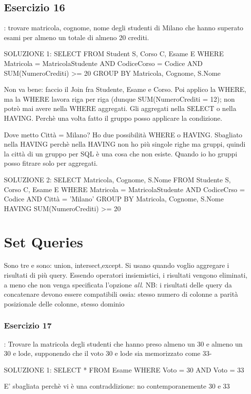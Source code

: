 \documentclass{article}
\begin{document}
\subsection{Esercizio 16}: trovare matricola, cognome, nome degli studenti di Milano che hanno superato esami per almeno un totale di almeno 20 crediti.

SOLUZIONE 1:
SELECT 
FROM Student S, Corso C, Esame E
WHERE Matricola = MatricolaStudente AND CodiceCorso = Codice AND SUM(NumeroCrediti) >= 20 
GROUP BY Matricola, Cognome, S.Nome

Non va bene: faccio il Join fra Studente, Esame e Corso. Poi applico la WHERE, ma la WHERE lavora riga per riga (dunque SUM(NumeroCrediti = 12); non potrò mai avere nella WHERE aggregati.
Gli aggregati nella SELECT o nella HAVING. Perchè una volta fatto il gruppo posso applicare la condizione.

Dove metto Città = Milano? Ho due possibilità WHERE o HAVING.
Sbagliato nella HAVING perchè nella HAVING non ho più singole righe ma gruppi, quindi la città di un gruppo per SQL è una cosa che non esiste. Quando io ho gruppi posso fitrare solo per aggregati.

SOLUZIONE 2:
SELECT Matricola, Cognome, S.Nome
FROM Studente S, Corso C, Esame E
WHERE Matricola = MatricolaStudente AND CodiceCrso = Codice AND Città = 'Milano'
GROUP BY Matricola, Cognome, S.Nome
HAVING SUM(NumeroCrediti) >= 20

\section{Set Queries}
Sono tre e sono: union, intersect,except.
Si usano quando voglio aggregare i risultati di più query. Essendo operatori insiemistici, i risultati vengono eliminati, a meno che non venga specificata l'opzione \emph{all}. 
NB: i risultati delle query da concatenare devono essere compatibili ossia:
    stesso numero di colonne
    a parità posizionale delle colonne, stesso dominio

\subsubsection{Esercizio 17}: Trovare la matricola degli studenti che hanno preso almeno un 30 e almeno un 30 e lode, supponendo che il voto 30 e lode sia memorizzato come 33-


SOLUZIONE 1: 
SELECT *
FROM Esame
WHERE Voto = 30 AND Voto = 33

E' sbagliata perchè vi è una contraddizione: no contemporanemente 30 e 33
\end{document}
